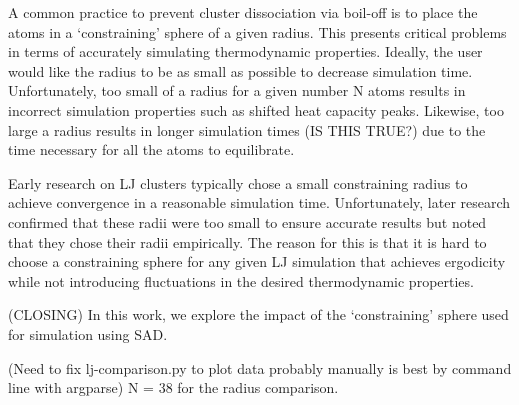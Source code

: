 \documentclass[letterpaper,twocolumn,amsmath,amssymb,pre,aps,10pt]{revtex4-1}
\begin{document}
A common practice to prevent cluster dissociation via boil-off is to place the atoms in a `constraining'
sphere of a given radius. This presents critical problems in terms of accurately simulating thermodynamic
properties. Ideally, the user would like the radius to be as small as possible to decrease simulation time.
Unfortunately, too small of a radius for a given number N atoms results in incorrect simulation properties
such as shifted heat capacity peaks. Likewise, too large a radius results in longer simulation times (IS THIS TRUE?)
due to the time necessary for all the atoms to equilibrate.

Early research on LJ clusters typically chose a small constraining radius to achieve convergence in
a reasonable simulation time. Unfortunately, later research confirmed that these radii were too small
to ensure accurate results but noted that they chose their radii empirically. The reason for this is that
it is hard to choose a constraining sphere for any given LJ simulation that achieves ergodicity while not
introducing fluctuations in the desired thermodynamic properties.



(CLOSING) In this work, we explore the impact of the `constraining' sphere used for simulation
using SAD.

(Need to fix lj-comparison.py to plot data probably manually is best by command line with argparse)
N = 38 for the radius comparison.

\end{document}
